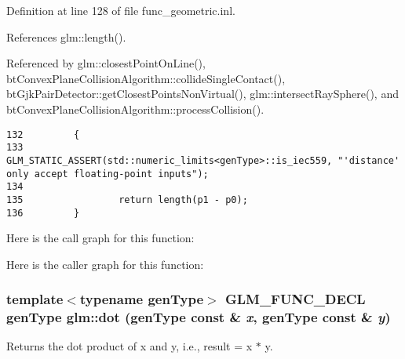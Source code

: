 Definition at line 128 of file func\_\-geometric.inl.

References glm::length().

Referenced by glm::closestPointOnLine(), btConvexPlaneCollisionAlgorithm::collideSingleContact(), btGjkPairDetector::getClosestPointsNonVirtual(), glm::intersectRaySphere(), and btConvexPlaneCollisionAlgorithm::processCollision().

\begin{Code}\begin{verbatim}132         {
133                 GLM_STATIC_ASSERT(std::numeric_limits<genType>::is_iec559, "'distance' only accept floating-point inputs");
134 
135                 return length(p1 - p0);
136         }
\end{verbatim}
\end{Code}




Here is the call graph for this function:

Here is the caller graph for this function:\hypertarget{group__core__func__geometric_g93acafc6005a3433ccf1dc3fa4230d51}{
\subsubsection[dot]{\setlength{\rightskip}{0pt plus 5cm}template$<$typename genType$>$ GLM\_\-FUNC\_\-DECL genType glm::dot (genType const \& {\em x}, \/  genType const \& {\em y})}}
\label{group__core__func__geometric_g93acafc6005a3433ccf1dc3fa4230d51}


Returns the dot product of x and y, i.e., result = x $\ast$ y.

